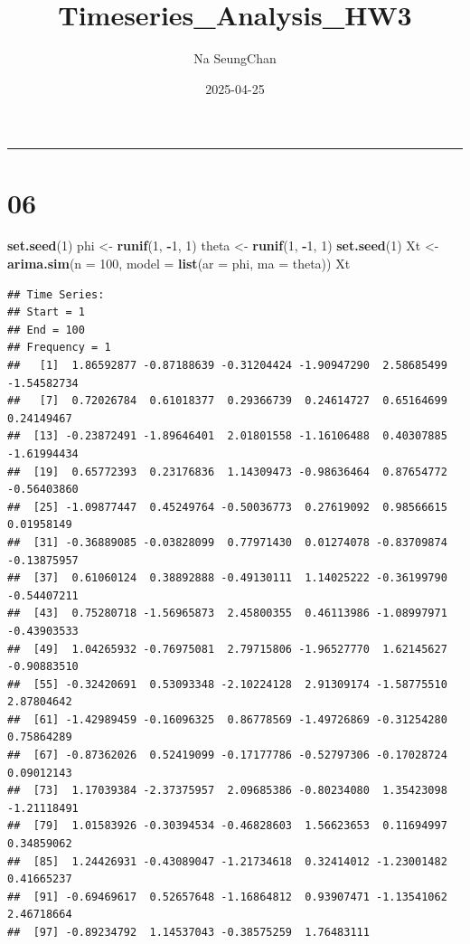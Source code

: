 \documentclass[
]{article}
\title{Timeseries\_Analysis\_HW3}
\author{Na SeungChan}
\date{2025-04-25}
\newenvironment{Shaded}{\begin{snugshade}}{\end{snugshade}}
\newcommand{\AttributeTok}[1]{\textcolor[rgb]{0.13,0.29,0.53}{#1}}
\newcommand{\DecValTok}[1]{\textcolor[rgb]{0.00,0.00,0.81}{#1}}
\newcommand{\FunctionTok}[1]{\textcolor[rgb]{0.13,0.29,0.53}{\textbf{#1}}}
\newcommand{\NormalTok}[1]{#1}
\newcommand{\OtherTok}[1]{\textcolor[rgb]{0.56,0.35,0.01}{#1}}
\newcommand{\SpecialCharTok}[1]{\textcolor[rgb]{0.81,0.36,0.00}{\textbf{#1}}}
\begin{document}
\maketitle

\begin{center}\rule{0.5\linewidth}{0.5pt}\end{center}

\section{06}\label{section}

\begin{Shaded}
\begin{Highlighting}[]
\FunctionTok{set.seed}\NormalTok{(}\DecValTok{1}\NormalTok{)}
\NormalTok{phi }\OtherTok{\textless{}{-}} \FunctionTok{runif}\NormalTok{(}\DecValTok{1}\NormalTok{, }\SpecialCharTok{{-}}\DecValTok{1}\NormalTok{, }\DecValTok{1}\NormalTok{)}
\NormalTok{theta }\OtherTok{\textless{}{-}} \FunctionTok{runif}\NormalTok{(}\DecValTok{1}\NormalTok{, }\SpecialCharTok{{-}}\DecValTok{1}\NormalTok{, }\DecValTok{1}\NormalTok{)}
\FunctionTok{set.seed}\NormalTok{(}\DecValTok{1}\NormalTok{)}
\NormalTok{Xt }\OtherTok{\textless{}{-}} \FunctionTok{arima.sim}\NormalTok{(}\AttributeTok{n =} \DecValTok{100}\NormalTok{, }\AttributeTok{model =} \FunctionTok{list}\NormalTok{(}\AttributeTok{ar =}\NormalTok{ phi, }\AttributeTok{ma =}\NormalTok{ theta))}
\NormalTok{Xt}
\end{Highlighting}
\end{Shaded}

\begin{verbatim}
## Time Series:
## Start = 1 
## End = 100 
## Frequency = 1 
##   [1]  1.86592877 -0.87188639 -0.31204424 -1.90947290  2.58685499 -1.54582734
##   [7]  0.72026784  0.61018377  0.29366739  0.24614727  0.65164699  0.24149467
##  [13] -0.23872491 -1.89646401  2.01801558 -1.16106488  0.40307885 -1.61994434
##  [19]  0.65772393  0.23176836  1.14309473 -0.98636464  0.87654772 -0.56403860
##  [25] -1.09877447  0.45249764 -0.50036773  0.27619092  0.98566615  0.01958149
##  [31] -0.36889085 -0.03828099  0.77971430  0.01274078 -0.83709874 -0.13875957
##  [37]  0.61060124  0.38892888 -0.49130111  1.14025222 -0.36199790 -0.54407211
##  [43]  0.75280718 -1.56965873  2.45800355  0.46113986 -1.08997971 -0.43903533
##  [49]  1.04265932 -0.76975081  2.79715806 -1.96527770  1.62145627 -0.90883510
##  [55] -0.32420691  0.53093348 -2.10224128  2.91309174 -1.58775510  2.87804642
##  [61] -1.42989459 -0.16096325  0.86778569 -1.49726869 -0.31254280  0.75864289
##  [67] -0.87362026  0.52419099 -0.17177786 -0.52797306 -0.17028724  0.09012143
##  [73]  1.17039384 -2.37375957  2.09685386 -0.80234080  1.35423098 -1.21118491
##  [79]  1.01583926 -0.30394534 -0.46828603  1.56623653  0.11694997  0.34859062
##  [85]  1.24426931 -0.43089047 -1.21734618  0.32414012 -1.23001482  0.41665237
##  [91] -0.69469617  0.52657648 -1.16864812  0.93907471 -1.13541062  2.46718664
##  [97] -0.89234792  1.14537043 -0.38575259  1.76483111
\end{verbatim}
\end{document}
